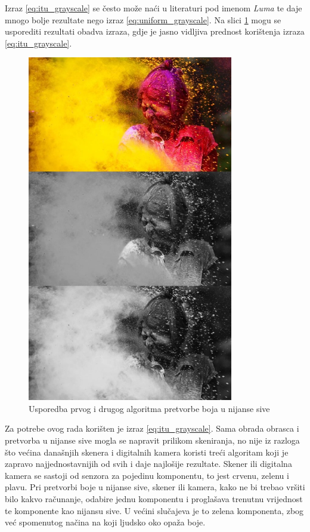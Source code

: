 Izraz \eqref{eq:itu_grayscale} se često može naći u literaturi pod imenom \emph{Luma} te daje mnogo bolje rezultate nego izraz \eqref{eq:uniform_grayscale}. Na slici \ref{fig:grayscale_example_all} mogu se usporediti rezultati obadva izraza, gdje je jasno vidljiva prednost korištenja izraza \eqref{eq:itu_grayscale}.

\begin{figure}[htb]
    \centering
    \includegraphics[width=9cm]{images/grayscale_example_all.jpg}
    \caption{Usporedba prvog i drugog algoritma pretvorbe boja u nijanse sive}
    \label{fig:grayscale_example_all}
\end{figure}

Za potrebe ovog rada korišten je izraz \eqref{eq:itu_grayscale}. Sama obrada obrasca i pretvorba u nijanse sive mogla se napravit prilikom skeniranja, no nije iz razloga što većina današnjih skenera i digitalnih kamera koristi treći algoritam koji je zapravo najjednostavnijih od svih i daje najlošije rezultate. Skener ili digitalna kamera se sastoji od senzora za pojedinu komponentu, to jest crvenu, zelenu i plavu. Pri pretvorbi boje u nijanse sive, skener ili kamera, kako ne bi trebao vršiti bilo kakvo računanje, odabire jednu komponentu i proglašava trenutnu vrijednost te komponente kao nijansu sive. U većini slučajeva je to zelena komponenta, zbog već spomenutog načina na koji ljudsko oko opaža boje.

